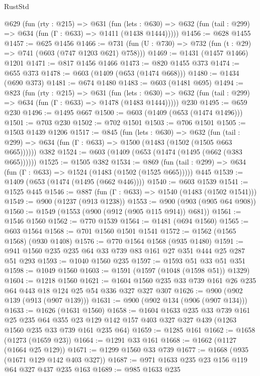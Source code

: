 \begin{lexlean}{RustStd}
\begin{coremodule}
  @629
    (fun (rty : @215) =>
    @631
      (fun (lets : @630) =>
      @632 (fun (tail : @299) => @634 (fun (Γ : @633) => @1411 (@1438 @1444)))))
@1456 := @628 @1455
@1457 := @625 @1456
@1466 := @731 (fun (U : @730) => @732 (fun (t : @29) => @741 (@603 (@747 @1203 @621) @758)))
@1469 := @1431 (@1457 @1466) @1201
@1471 := @817 @1456 @1466
@1473 := @820 @1455 @373
@1474 := @655 @373
@1478 := @603 (@1409 (@653 (@1474 @668)))
@1480 := @1434 (@690 @373)
@1481 := @674 @1480
@1483 := @603 (@1481 @695)
@1494 := @823
    (fun (rty : @215) =>
    @631
      (fun (lets : @630) =>
      @632 (fun (tail : @299) => @634 (fun (Γ : @633) => @1478 (@1483 @1444)))))
    @230
@1495 := @659 @230
@1496 := @1495 @667
@1500 := @603 (@1409 (@653 (@1474 @1496)))
@1501 := @703 @230
@1502 := @702 @1501
@1503 := @706 @1501
@1505 := @1503 @1439 @1206
@1517 := @845
    (fun (lets : @630) =>
    @632 (fun (tail : @299) => @634 (fun (Γ : @633) => @1500 (@1483 (@1502 (@1505 @663 @665))))))
    @382
@1524 := @603 (@1409 (@653 (@1474 (@1495 (@662 (@383 @665))))))
@1525 := @1505 @382
@1534 := @869
    (fun (tail : @299) => @634 (fun (Γ : @633) => @1524 (@1483 (@1502 (@1525 @665)))))
    @445
@1539 := @1409 (@653 (@1474 (@1495 (@662 @446))))
@1540 := @603 @1539
@1541 := @1525 @445
@1546 := @887 (fun (Γ : @633) => @1540 (@1483 (@1502 @1541)))
@1549 := @900 (@1237 (@913 @1238))
@1553 := @900 (@903 (@905 @64 @908))
@1560 := @1549 (@1553 (@900 (@912 (@905 @115 @914)) @681))
@1561 := @1546 @1560
@1562 := @770 @1539
@1564 := @1481 (@694 @1560)
@1565 := @603 @1564
@1568 := @701 @1560 @1501 @1541
@1572 := @1562 (@1565 @1568) (@930 @1408)
@1576 := @770 @1564 @1568 (@935 @1480)
@1591 := @941 @1560 @235 @235 @64 @33 @739 @83 @161 @27 @351 @444 @25 @287 @51 @293
@1593 := @1040 @1560 @235
@1597 := @1593 @51 @33 @51 @351
@1598 := @1049 @1560
@1603 := @1591 (@1597 (@1048 (@1598 @51)) @1329)
@1604 := @1218 @1560
@1621 := @1604 @1560 @235 @33 @739 @161 @26 @235 @64 @443 @18 @124 @25 @54 @336 @327 @327 @307
@1626 := @900 (@902 @139 (@913 (@907 @139)))
@1631 := @900 (@902 @134 (@906 (@907 @134)))
@1633 := @1626 (@1631 @1560)
@1658 := @1604
    @1633
    @235
    @33
    @739
    @161
    @25
    @235
    @64
    @355
    @23
    @129
    @142
    @157
    @403
    @327
    @327
    @439
    (@1263 @1560 @235 @33 @739 @161 @235 @64)
@1659 := @1285 @161
@1662 := @1658 (@1273 (@1659 @23))
@1664 := @1291 @33 @161
@1668 := @1662 (@1127 (@1664 @25 @129))
@1671 := @1299 @1560 @33 @739
@1677 := @1668 (@935 (@1671 @129 @142 @403 @327))
@1687 := @971 @1633 @235 @23 @156 @119 @64 @327 @437 @235 @163
@1689 := @985 @1633 @235

\end{coremodule}
\end{lexlean}
